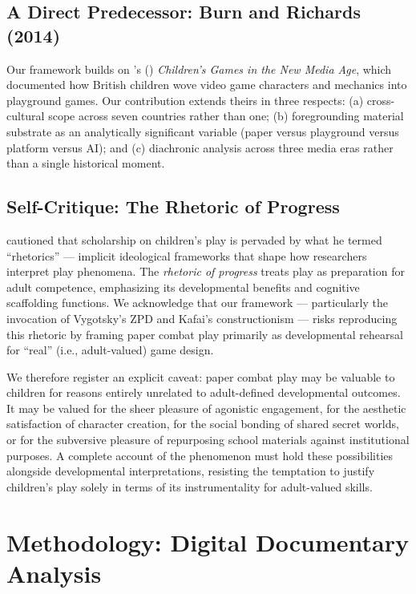 \documentclass[12pt]{article}
\begin{document}
\subsection{A Direct Predecessor: Burn and Richards (2014)}

Our framework builds on \citeauthor{burn2014}'s (\citeyear{burn2014}) \emph{Children's Games in the New Media Age}, which documented how British children wove video game characters and mechanics into playground games. Our contribution extends theirs in three respects: (a) cross-cultural scope across seven countries rather than one; (b) foregrounding material substrate as an analytically significant variable (paper versus playground versus platform versus AI); and (c) diachronic analysis across three media eras rather than a single historical moment.

\subsection{Self-Critique: The Rhetoric of Progress}

\citet{suttonsmith1997} cautioned that scholarship on children's play is pervaded by what he termed ``rhetorics'' --- implicit ideological frameworks that shape how researchers interpret play phenomena. The \emph{rhetoric of progress} treats play as preparation for adult competence, emphasizing its developmental benefits and cognitive scaffolding functions. We acknowledge that our framework --- particularly the invocation of Vygotsky's ZPD and Kafai's constructionism --- risks reproducing this rhetoric by framing paper combat play primarily as developmental rehearsal for ``real'' (i.e., adult-valued) game design.

We therefore register an explicit caveat: paper combat play may be valuable to children for reasons entirely unrelated to adult-defined developmental outcomes. It may be valued for the sheer pleasure of agonistic engagement, for the aesthetic satisfaction of character creation, for the social bonding of shared secret worlds, or for the subversive pleasure of repurposing school materials against institutional purposes. A complete account of the phenomenon must hold these possibilities alongside developmental interpretations, resisting the temptation to justify children's play solely in terms of its instrumentality for adult-valued skills.

\section{Methodology: Digital Documentary Analysis}
\end{document}
